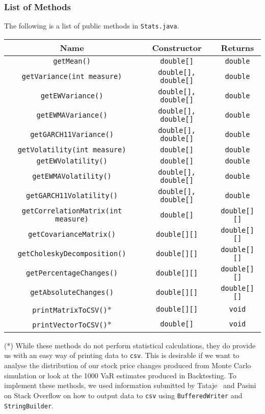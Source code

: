 \documentclass[../Dissertation.tex]{subfiles}
\begin{document}
\subsubsection{List of Methods}

The following is a list of public methods in \lstinline|Stats.java|. 
\begin{center}
\begin{tabular}{||c | c | c ||} 
\hline
Name & Constructor & Returns \\ [0.5ex] 
\hline\hline
\lstinline|getMean()| & \lstinline|double[]| & \lstinline|double|\\ 
\hline
\lstinline|getVariance(int measure)| & \lstinline|double[], double[]| & \lstinline|double| \\
\hline
\lstinline|getEWVariance()| & \lstinline|double[], double[]| & \lstinline|double| \\
\hline
\lstinline|getEWMAVariance()| & \lstinline|double[], double[]| & \lstinline|double|\\
\hline
\lstinline|getGARCH11Variance()| & \lstinline|double[], double[]| & \lstinline|double|\\
\hline
\lstinline|getVolatility(int measure)| & \lstinline|double[]| & \lstinline|double|\\
\hline
\lstinline|getEWVolatility()| & \lstinline|double[]| & \lstinline|double|\\
\hline
\lstinline|getEWMAVolatility()| & \lstinline|double[], double[]| & \lstinline|double|\\
\hline
\lstinline|getGARCH11Volatility()| & \lstinline|double[], double[]| & \lstinline|double|\\
\hline
\lstinline|getCorrelationMatrix(int measure)| & \lstinline|double[]| & \lstinline|double[][]|\\
\hline
\lstinline|getCovarianceMatrix()| & \lstinline|double[][]| & \lstinline|double[][]|\\
\hline
\lstinline|getCholeskyDecomposition()| & \lstinline|double[][]| & \lstinline|double[][]|\\
\hline
\lstinline|getPercentageChanges()| &\lstinline|double[][]| & \lstinline|double[][]|\\
\hline
\lstinline|getAbsoluteChanges()| & \lstinline|double[][]| & \lstinline|double[][]|\\
\hline
\lstinline|printMatrixToCSV()|* &\lstinline|double[][]| & \lstinline|void|\\
\hline
\lstinline|printVectorToCSV()|* & \lstinline|double[]| & \lstinline|void|\\[1ex] 
\hline
\end{tabular}
\end{center}
(*) While these methods do not perform statistical calculations, they do provide us with an easy way of printing data to \lstinline|csv|.
This is desirable if we want to analyse the distribution of our stock price changes produced from Monte Carlo simulation or look at the 1000 VaR estimates produced in Backtesting.
To implement these methods, we used information submitted by Tataje~\cite{Tataje:2013} and Pasini~\cite{Pasini:2016} on Stack Overflow on how to output data to \lstinline|csv| using \lstinline|BufferedWriter| and \lstinline|StringBuilder|.
\end{document}
